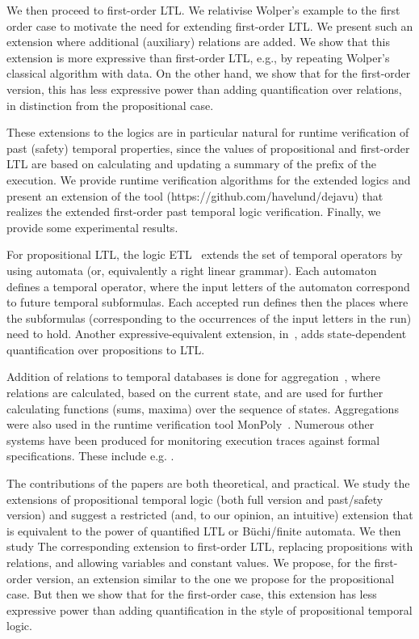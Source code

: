 We then proceed to first-order LTL. We relativise Wolper's example to the first
order case to motivate the need for
extending first-order LTL.
We present such an extension where additional (auxiliary) relations are
added. We show that this extension is more expressive than
first-order LTL, e.g., by repeating Wolper's classical algorithm
with data. On the other hand, we show that for the first-order version, this has less 
expressive power than adding quantification over relations, in distinction from the propositional case.

These extensions to the logics are in particular natural for
runtime verification of past (safety) temporal properties, since
the values of propositional and first-order LTL are based
on calculating and updating a summary of the prefix of the execution.
We provide runtime verification algorithms for the extended
logics and present an extension of the 
\dejavu{} tool (https://github.com/havelund/dejavu) that
realizes the extended first-order past temporal logic verification.
Finally, we provide some experimental results.

%
For propositional LTL, the logic ETL~\cite{WVS,Wolper} extends
the set of temporal operators 
by using automata (or, equivalently a right linear grammar). Each automaton defines a temporal operator,
where the input letters of the automaton correspond to future temporal subformulas. Each accepted run defines then the places
where the subformulas (corresponding to the occurrences of the input letters in the run) need to hold. Another expressive-equivalent extension, 
in~\cite{Wolper}, adds
state-dependent quantification over propositions to LTL.

Addition of relations to temporal databases is done
for aggregation~\cite{Libkin}, where relations are
calculated, based on the current state, and are used for further calculating
functions (sums, maxima) over the sequence of states. Aggregations were also used in the runtime verification tool 
{\sf MonPoly}~\cite{agrebasin}.
%
%
Numerous other systems have been produced for monitoring
execution traces against formal specifications. 
These include e.g. \cite{Meredith2011,larva,Reger2015,halle-beepbeep-ieee-12,LOLA}. 


\iffalse
The contributions of the papers are both theoretical, and
practical. We study the extensions of propositional temporal logic (both full version and past/safety version) and suggest a restricted (and, to our opinion, an intuitive) extension that is equivalent to the power of quantified LTL or B\"{u}chi/finite automata. We then study 
The corresponding extension to first-order LTL, replacing propositions with relations, and allowing variables and constant values. We propose, for the first-order version, an extension similar to the one we propose for the propositional case. But then we show that for the first-order case, this extension has
less expressive power than adding quantification in the style of propositional temporal logic.

